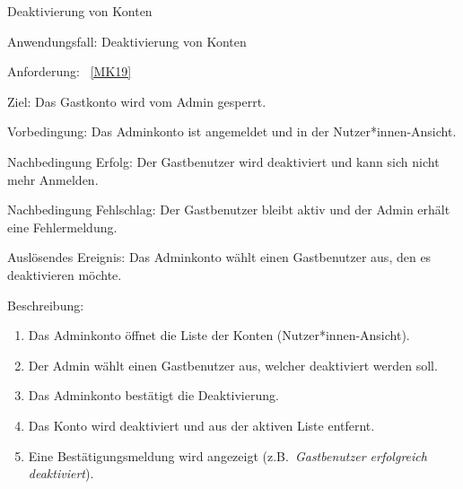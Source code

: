\begin{function}{60}{Deaktivierung von Konten}
    \item[Anwendungsfall:] Deaktivierung von Konten
    \item[Anforderung:] ~\ref{MK19} 
    \item[Ziel:] Das Gastkonto wird vom Admin gesperrt.
    \item[Vorbedingung:] Das Adminkonto ist angemeldet und in der Nutzer*innen-Ansicht.
    \item[Nachbedingung Erfolg:] Der Gastbenutzer wird deaktiviert und kann sich nicht mehr Anmelden.
    \item[Nachbedingung Fehlschlag:] Der Gastbenutzer bleibt aktiv und der Admin erhält eine Fehlermeldung.
    \item[Auslösendes Ereignis:] Das Adminkonto wählt einen Gastbenutzer aus, den es deaktivieren möchte.
    \item[Beschreibung:] ~
    \begin{enumerate}
        \item Das Adminkonto öffnet die Liste der Konten (Nutzer*innen-Ansicht).
        \item Der Admin wählt einen Gastbenutzer aus, welcher deaktiviert werden soll.
        \item Das Adminkonto bestätigt die Deaktivierung.
        \item Das Konto wird deaktiviert und aus der aktiven Liste entfernt.
        \item Eine Bestätigungsmeldung wird angezeigt (z.B.\ \textit{Gastbenutzer erfolgreich deaktiviert}).
    \end{enumerate}
\end{function}

\pagebreak

